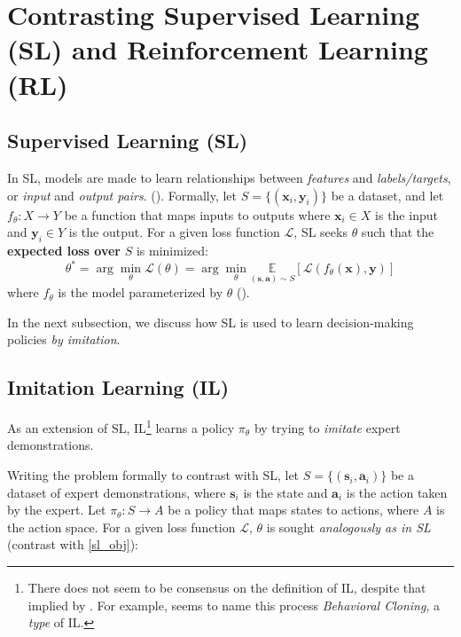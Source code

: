 \documentclass{article} %
\begin{document}
\section{Contrasting Supervised Learning (SL) and Reinforcement Learning (RL)}
\subsection{Supervised Learning (SL)}

In SL, models are made to learn relationships between \textit{features} and \textit{labels/targets}, 
or \textit{input} and \textit{output pairs}. (\cite{Goodfellow-et-al-2016}). 
Formally, let $S = \{(\mathbf{x}_i, \mathbf{y}_i)\}$ be a dataset, 
and let $f_\theta: X \to Y$ be a function that maps inputs to outputs
where $\mathbf{x}_i \in X$ is the input and $\mathbf{y}_i \in Y$ is the output.
For a given loss function $\mathcal{L}$, SL seeks $\theta$ 
such that the \textbf{expected loss over} $S$ is minimized:
\begin{equation} \label{sl_obj}
    \theta^* = \arg\min_\theta \mathcal{L}(\theta) = \arg\min_\theta \underset{(\mathbf{s}, \mathbf{a}) \sim S}{\mathbb{E}}[\mathcal{L}(f_\theta(\mathbf{x}), \mathbf{y})]
\end{equation}
where $f_\theta$ is the model parameterized by $\theta$ (\cite{Levine-et-al-2023}).

In the next subsection, we discuss how SL is used to learn decision-making policies \textit{by imitation}.

\subsection{Imitation Learning (IL)}

As an extension of SL, IL\footnote{There does not seem to be consensus on the definition of IL, despite that implied by \cite{Levine-et-al-2023}. For example, \cite{underactuated-2023} seems to name this process \textit{Behavioral Cloning}, a \textit{type} of IL.} 
learns a policy $\pi_\theta$ by trying to \textit{imitate} expert demonstrations.

Writing the problem formally to contrast with SL,
let $S = \{(\mathbf{s}_i, \mathbf{a}_i)\}$ be a dataset of expert demonstrations, 
where $\mathbf{s}_i$ is the state and $\mathbf{a}_i$ is the action taken by the expert.
Let $\pi_\theta: S \to A$ be a policy that maps states to actions, where $A$ is the action space. 
For a given loss function $\mathcal{L}$, $\theta$ is sought \textit{analogously as in SL}
(contrast with \ref{sl_obj}):
\end{document}
